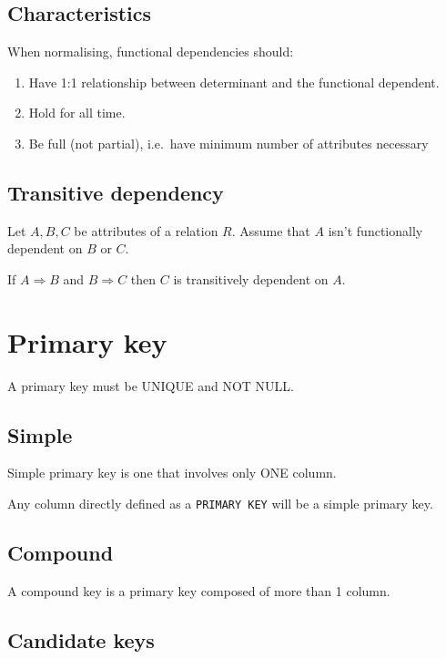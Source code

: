 \subsection{Characteristics}\label{characteristics}

When normalising, functional dependencies should:

\begin{enumerate}
\def\labelenumi{\arabic{enumi}.}
\item
  Have 1:1 relationship between determinant and the functional
  dependent.
\item
  Hold for all time.
\item
  Be full (not partial), i.e.~have minimum number of attributes
  necessary
\end{enumerate}

\subsection{Transitive dependency}\label{transitive-dependency}

Let \(A, B, C\) be attributes of a relation \(R\). Assume that \(A\)
isn't functionally dependent on \(B\) or \(C\).

If \(A \Rightarrow B\) and \(B \Rightarrow C\) then \(C\) is
transitively dependent on \(A\).

\section{Primary key}\label{primary-key}

A primary key must be UNIQUE and NOT NULL.

\subsection{Simple}\label{simple}

Simple primary key is one that involves only ONE column.

Any column directly defined as a \texttt{PRIMARY\ KEY} will be a simple
primary key.

\subsection{Compound}\label{compound}

A compound key is a primary key composed of more than 1 column.

\subsection{Candidate keys}\label{candidate-keys}


